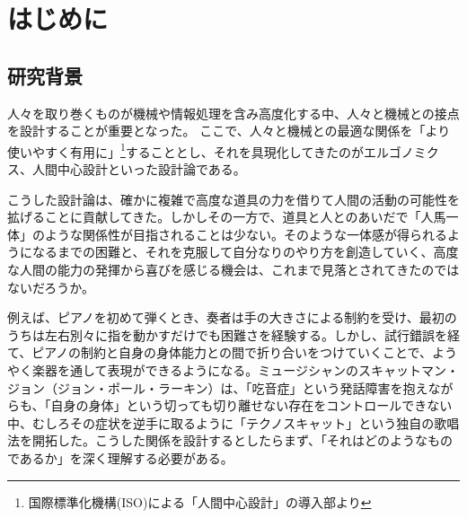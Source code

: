 \chapter{はじめに}
\label{introduction}

\section{研究背景}
\label{subject}




人々を取り巻くものが機械や情報処理を含み高度化する中、人々と機械との接点を設計することが重要となった。
ここで、人々と機械との最適な関係を「より使いやすく有用に」\footnote{国際標準化機構(ISO)による「人間中心設計」の導入部\cite{hcd}より}することとし、それを具現化してきたのがエルゴノミクス、人間中心設計といった設計論である。



こうした設計論は、確かに複雑で高度な道具の力を借りて人間の活動の可能性を拡げることに貢献してきた。しかしその一方で、道具と人とのあいだで「人馬一体」のような関係性が目指されることは少ない。そのような一体感が得られるようになるまでの困難と、それを克服して自分なりのやり方を創造していく、高度な人間の能力の発揮から喜びを感じる機会は、これまで見落とされてきたのではないだろうか。

例えば、ピアノを初めて弾くとき、奏者は手の大きさによる制約を受け、最初のうちは左右別々に指を動かすだけでも困難さを経験する。しかし、試行錯誤を経て、ピアノの制約と自身の身体能力との間で折り合いをつけていくことで、ようやく楽器を通して表現ができるようになる。ミュージシャンのスキャットマン・ジョン（ジョン・ポール・ラーキン）は、「吃音症」という発話障害を抱えながらも、「自身の身体」という切っても切り離せない存在をコントロールできない中、むしろその症状を逆手に取るように「テクノスキャット」という独自の歌唱法を開拓した。こうした関係を設計するとしたらまず、「それはどのようなものであるか」を深く理解する必要がある。

